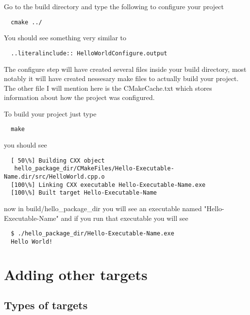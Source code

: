 \documentclass[12pt]{article}
\begin{document}
Go to the build directory and type the following to configure your project

\begin{verbatim}
  cmake ../
\end{verbatim}

You should see something very similar to
 
\begin{verbatim}
  ..literalinclude:: HelloWorldConfigure.output
\end{verbatim}

The configure step will have created several files inside your build
directory, most notably it will have created nessesary make files to
actually build your project.  The other file I will mention here is
the CMakeCache.txt which stores information about how the project was
configured.

To build your project just type

\begin{verbatim}  
  make
\end{verbatim}

you should see

\begin{verbatim} 
  [ 50\%] Building CXX object
   hello_package_dir/CMakeFiles/Hello-Executable-Name.dir/src/HelloWorld.cpp.o
  [100\%] Linking CXX executable Hello-Executable-Name.exe
  [100\%] Built target Hello-Executable-Name
\end{verbatim}

now in build/hello\_package\_dir you will see an executable named
"Hello-Executable-Name" and if you run that executable you will see

\begin{verbatim}
  $ ./hello_package_dir/Hello-Executable-Name.exe 
  Hello World!
\end{verbatim}


\section{Adding other targets}

\subsection{Types of targets}
\end{document}

